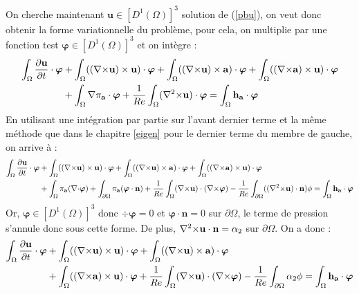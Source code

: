 On cherche maintenant $\mathbf{u}\in [D^1(\Omega)]^3$ solution de (\ref{pbu}), on veut donc obtenir la forme variationnelle du problème, pour cela, on multiplie par une fonction test $\bm{\varphi}\in [D^1(\Omega)]^3$ et on intègre :
\begin{align*}
\int_\Omega \frac{\partial \mathbf{u}}{\partial t}\cdot \bm{\varphi} &+ \int_\Omega (({\nabla\times} \mathbf{u})\times \mathbf{u})\cdot \bm{\varphi} + \int_\Omega (({\nabla\times} \mathbf{u})\times \mathbf{a})\cdot\bm{\varphi} + \int_\Omega (({\nabla\times} \mathbf{a})\times \mathbf{u})\cdot\bm{\varphi} \\
&+ \int_\Omega {\nabla}\pi_{\mathbf{a}}\cdot\bm{\varphi} + \frac{1}{Re}\int_\Omega ({\nabla^2\times} \mathbf{u})\cdot\bm{\varphi} = \int_\Omega \mathbf{h_a}\cdot\bm{\varphi}
\end{align*}
En utilisant une intégration par partie sur l'avant dernier terme et la même méthode que dans le chapitre \ref{eigen} pour le dernier terme du membre de gauche, on arrive à :
\begin{align*}
\int_\Omega \frac{\partial \mathbf{u}}{\partial t}\cdot \bm{\varphi} &+ \int_\Omega (({\nabla\times} \mathbf{u})\times \mathbf{u})\cdot \bm{\varphi} + \int_\Omega (({\nabla\times} \mathbf{u})\times \mathbf{a})\cdot\bm{\varphi} + \int_\Omega (({\nabla\times} \mathbf{a})\times \mathbf{u})\cdot\bm{\varphi}\\
&+ \int_\Omega \pi_{\mathbf{a}}({\nabla\cdot}\bm{\varphi}) + \int_{\partial \Omega} \pi_{\mathbf{a}}(\bm{\varphi}\cdot \mathbf{n}) + \frac{1}{Re}\int_\Omega ({\nabla\times} \mathbf{u})\cdot({\nabla\times}\bm{\varphi}) -\frac{1}{Re}\int_{\partial\Omega} (({\nabla^2\times} \mathbf{u})\cdot \mathbf{n})\phi = \int_\Omega \mathbf{h_a}\cdot\bm{\varphi}
\end{align*}
Or, $\bm{\varphi}\in [D^1(\Omega)]^3$ donc $\div\bm{\varphi}=0$ et $\bm{\varphi}\cdot \mathbf{n}=0$ sur $\partial\Omega$, le terme de pression s'annule donc sous cette forme. De plus, ${\nabla^2\times} \mathbf{u}\cdot \mathbf{n}=\alpha_2$ sur $\partial\Omega$. On a donc :
\begin{equation}
\label{fvu}
\begin{aligned}
\int_\Omega \frac{\partial \mathbf{u}}{\partial t}\cdot \bm{\varphi} &+ \int_\Omega (({\nabla\times} \mathbf{u})\times \mathbf{u})\cdot \bm{\varphi} + \int_\Omega (({\nabla\times} \mathbf{u})\times \mathbf{a})\cdot\bm{\varphi} \\
&+ \int_\Omega (({\nabla\times} \mathbf{a})\times \mathbf{u})\cdot\bm{\varphi} + \frac{1}{Re}\int_\Omega ({\nabla\times} \mathbf{u})\cdot({\nabla\times}\bm{\varphi}) -\frac{1}{Re}\int_{\partial\Omega} \alpha_2\phi = \int_\Omega \mathbf{h_a}\cdot\bm{\varphi}
\end{aligned}
\end{equation}


